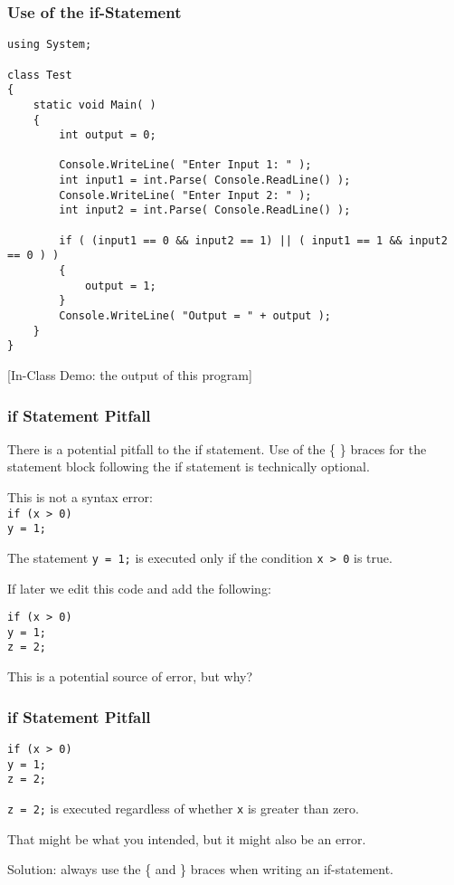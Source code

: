 \begin{frame}[fragile]
\frametitle{Use of the if-Statement}

{\scriptsize
\begin{verbatim}
using System;

class Test
{
    static void Main( )
    {
        int output = 0;

        Console.WriteLine( "Enter Input 1: " ); 
        int input1 = int.Parse( Console.ReadLine() );
        Console.WriteLine( "Enter Input 2: " ); 
        int input2 = int.Parse( Console.ReadLine() );

        if ( (input1 == 0 && input2 == 1) || ( input1 == 1 && input2 == 0 ) )
        {
            output = 1; 
        }
        Console.WriteLine( "Output = " + output );
    }
}
\end{verbatim}
}

[In-Class Demo: the output of this program]

\end{frame}

\begin{frame}
\frametitle{if Statement Pitfall}
There is a potential pitfall to the if statement. Use of the \{ \} braces for the statement block following the if statement is technically optional.

This is not a syntax error:\\
\texttt{if (x > 0)}\\
\quad\texttt{y = 1;}

The statement \texttt{y = 1;} is executed only if the condition \texttt{x > 0} is true.

If later we edit this code and add the following:

\texttt{if (x > 0)}\\
\quad\texttt{y = 1;}\\
\quad\texttt{z = 2;}

This is a potential source of error, but why?

\end{frame}

\begin{frame}
\frametitle{if Statement Pitfall}

\texttt{if (x > 0)}\\
\quad\texttt{y = 1;}\\
\quad\texttt{z = 2;}

\texttt{z = 2;} is executed regardless of whether \texttt{x} is greater than zero.

That might be what you intended, but it might also be an error.

Solution: always use the \{ and \} braces when writing an if-statement.

\end{frame}

